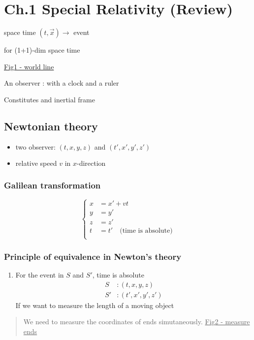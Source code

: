 \documentclass[12pt]{article}
\begin{document}
\section{Ch.1 Special Relativity (Review)} %

space time $(t,\vec{x})\to$ event 

for (1+1)-dim space time

\underline{Fig1 - world line}

An observer : with a clock and a ruler

Constitutes and inertial frame

\subsection{Newtonian theory} %

\begin{itemize}
	\item two observer:  $(t,x,y,z)$ and $(t',x',y',z')$

\end{itemize}
\begin{itemize}
	\item relative speed $v$ in $x$-direction

\end{itemize}
\subsubsection{Galilean transformation} %


\begin{equation}
\left\{\begin{aligned}
x &= x' + vt\\
y &= y'\\
z &= z'\\
t &= t'\quad \text{(time is absolute)}\\
\end{aligned}\right.
\end{equation}

\subsubsection{Principle of equivalence in Newton's theory} %

\begin{enumerate}
	\item For the event in $S$ and $S'$, time is absolute
    $$    \begin{aligned}    S  &: (t,x,y,z)\\    S' &: (t',x',y',z')    \end{aligned}    $$    If we want to measure the length of a moving object

\end{enumerate}
\begin{quote}
	We need to measure the coordinates of ends simutaneously.
\underline{Fig2 - measure ends}
\end{quote}
\end{document}

